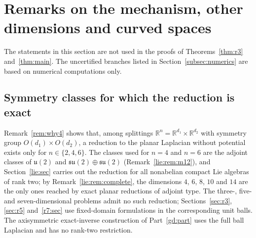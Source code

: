 \documentclass[11pt]{amsart}
\theoremstyle{definition}
\theoremstyle{remark}
\numberwithin{equation}{section}
\newcommand{\R}{\mathbb{R}}
\begin{document}
\section{Remarks on the mechanism, other dimensions and curved spaces}\label{sec:remarks}

The statements in this section are not used in the proofs of Theorems~\ref{thm:r3} and~\ref{thm:main}. The uncertified branches listed in Section~\ref{subsec:numerics} are based on numerical computations only.

\subsection{Symmetry classes for which the reduction is exact}
Remark~\ref{rem:why4} shows that, among splittings $\R^n=\R^{d_1}\times\R^{d_2}$ with symmetry group $O(d_1)\times O(d_2)$, a reduction to the planar Laplacian without potential exists only for $n\in\{2,4,6\}$. The classes used for $n=4$ and $n=6$ are the adjoint classes of $\mathfrak u(2)$ and $\mathfrak{su}(2)\oplus\mathfrak{su}(2)$ (Remark~\ref{lie:rem:m12}), and Section~\ref{lie:sec} carries out the reduction for all nonabelian compact Lie algebras of rank two; by Remark~\ref{lie:rem:complete}, the dimensions $4$, $6$, $8$, $10$ and $14$ are the only ones reached by exact planar reductions of adjoint type. The three-, five- and seven-dimensional problems admit no such reduction; Sections~\ref{sec:r3}, \ref{sec:r5} and~\ref{r7:sec} use fixed-domain formulations in the corresponding unit balls. The axisymmetric exact-inverse construction of Part~\ref{gd:part} uses the full ball Laplacian and has no rank-two restriction.
\end{document}
